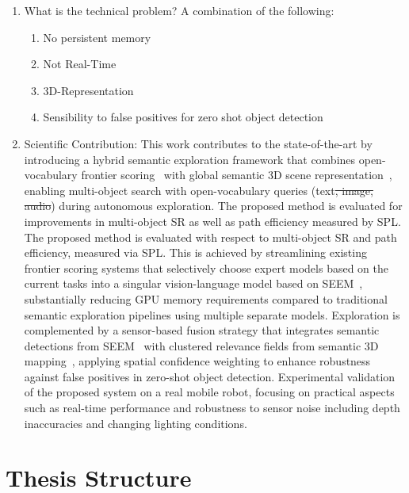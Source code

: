 \begin{enumerate}
    \item What is the technical problem? A combination of the following:
    \begin{enumerate}
        \item No persistent memory
        \item Not Real-Time
        \item 3D-Representation
        \item Sensibility to false positives for zero shot object detection
    \end{enumerate}
    \item Scientific Contribution:
        This work contributes to the state-of-the-art by introducing a hybrid semantic exploration framework that combines open-vocabulary frontier scoring~\cite{yokoyama2024vlfm} with global semantic 3D scene representation~\cite{kashu2023openfusion}, enabling multi-object search with open-vocabulary queries (text\sout{, image, audio}) during autonomous exploration. The proposed method is evaluated for improvements in multi-object \ac{SR} as well as path efficiency measured by \ac{SPL}. The proposed method is evaluated with respect to multi-object \ac{SR} and path efficiency, measured via \ac{SPL}. This is achieved by streamlining existing frontier scoring systems that selectively choose expert models based on the current tasks into a singular vision-language model based on \ac{SEEM}~\cite{zou2023seem}, substantially reducing GPU memory requirements compared to traditional semantic exploration pipelines using multiple separate models. Exploration is complemented by a sensor-based fusion strategy that integrates semantic detections from \ac{SEEM}~\cite{zou2023seem} with clustered relevance fields from semantic 3D mapping~\cite{kashu2023openfusion}, applying spatial confidence weighting to enhance robustness against false positives in zero-shot object detection. Experimental validation of the proposed system on a real mobile robot, focusing on practical aspects such as real-time performance and robustness to sensor noise including depth inaccuracies and changing lighting conditions.
\end{enumerate}

\section{Thesis Structure}
